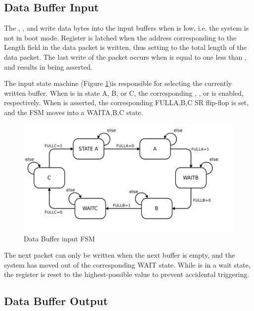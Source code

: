 \subsection{Data Buffer Input}
        
      
The , , and  write
data bytes into the input buffers when  is low, i.e. the
system is not in boot mode. Register  is latched
when the address corresponding to the Length field in the data packet
is written, thus setting  to the total length of
the data packet. The last write of the packet occurs when
 is equal to one less than ,
and results in  being asserted.

The input state machine  (Figure \ref{InputFSM})is
responsible for selecting the currently written buffer. When
 is in state A, B, or C, the corresponding
, , or  is enabled,
respectively. When  is asserted, the corresponding
FULL{A,B,C} SR flip-flop is set, and the FSM moves into a WAIT{A,B,C}
state.

      
\begin{figure}[h!]
  \includegraphics[scale=0.8]{input.FSM.svg}
  \caption{Data Buffer input FSM}
  \label{InputFSM}
\end{figure}

The next packet can only be written when the next buffer is empty, and
the system has moved out of the corresponding WAIT state. While
 is in a wait state, the  register is
reset to the highest-possible value to prevent accidental triggering.
      
\subsection{Data Buffer Output}
      
